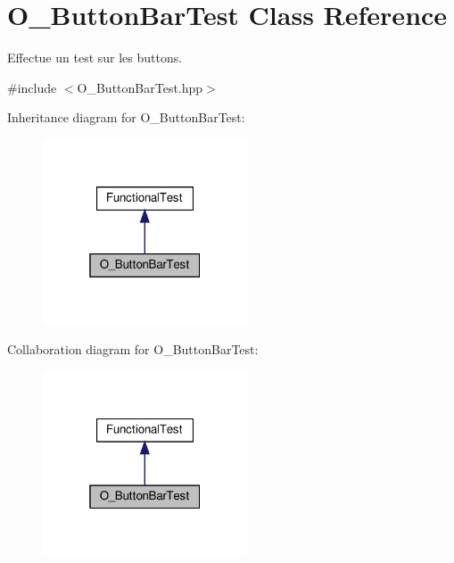 \hypertarget{classO__ButtonBarTest}{}\section{O\+\_\+\+Button\+Bar\+Test Class Reference}
\label{classO__ButtonBarTest}


Effectue un test sur les buttons.  




{\ttfamily \#include $<$O\+\_\+\+Button\+Bar\+Test.\+hpp$>$}



Inheritance diagram for O\+\_\+\+Button\+Bar\+Test\+:
\nopagebreak
\begin{figure}[H]
\begin{center}
\leavevmode
\includegraphics[width=172pt]{classO__ButtonBarTest__inherit__graph}
\end{center}
\end{figure}


Collaboration diagram for O\+\_\+\+Button\+Bar\+Test\+:
\nopagebreak
\begin{figure}[H]
\begin{center}
\leavevmode
\includegraphics[width=172pt]{classO__ButtonBarTest__coll__graph}
\end{center}
\end{figure}
